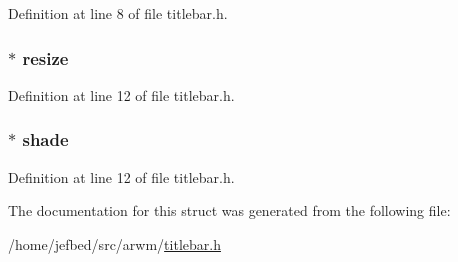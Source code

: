 Definition at line 8 of file titlebar.h.

\hypertarget{struct___a_r_w_m_titlebar_data_aec33f1f621f0cf6b9a4033711f9d8247}{
\subsubsection[{resize}]{ $\ast$ {\bf resize}}}
\label{struct___a_r_w_m_titlebar_data_aec33f1f621f0cf6b9a4033711f9d8247}


Definition at line 12 of file titlebar.h.

\hypertarget{struct___a_r_w_m_titlebar_data_af6d276c5f809297ef5dffa6169b65bf4}{
\subsubsection[{shade}]{ $\ast$ {\bf shade}}}
\label{struct___a_r_w_m_titlebar_data_af6d276c5f809297ef5dffa6169b65bf4}


Definition at line 12 of file titlebar.h.



The documentation for this struct was generated from the following file:\begin{DoxyCompactItemize}
\item 
/home/jefbed/src/arwm/\hyperlink{titlebar_8h}{titlebar.h}\end{DoxyCompactItemize}
